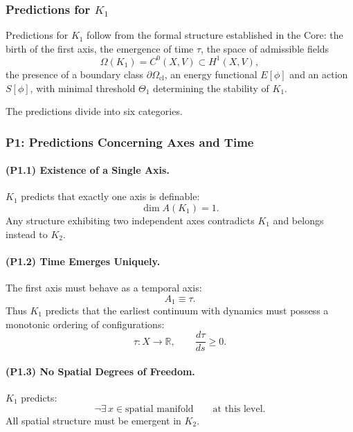 

\subsubsection{Predictions for \texorpdfstring{$K_1$}{K_1}}
\label{sec:predictions-k1}

Predictions for $K_1$ follow from the formal structure established in the
Core: the birth of the first axis, the emergence of time $\tau$, the space
of admissible fields
\[
\Omega(K_1) = C^0(X,V) \subset H^1(X,V),
\]
the presence of a boundary class $\partial\Omega_{\mathrm{cl}}$, an energy
functional $E[\phi]$ and an action $S[\phi]$, with minimal threshold
$\Theta_1$ determining the stability of $K_1$.

The predictions divide into six categories.

\subsubsection{P1: Predictions Concerning Axes and Time}

\paragraph{(P1.1) Existence of a Single Axis.}
$K_1$ predicts that exactly one axis is definable:
\[
\dim A(K_1) = 1.
\]
Any structure exhibiting two independent axes contradicts $K_1$ and belongs
instead to $K_2$.

\paragraph{(P1.2) Time Emerges Uniquely.}
The first axis must behave as a temporal axis:
\[
A_1 \equiv \tau.
\]
Thus $K_1$ predicts that the earliest continuum with dynamics must possess
a monotonic ordering of configurations:
\[
\tau: X \to \mathbb{R}, \qquad \frac{d\tau}{ds} \ge 0.
\]

\paragraph{(P1.3) No Spatial Degrees of Freedom.}
$K_1$ predicts:
\[
\neg \exists\, x \in \text{spatial manifold} \qquad\text{at this level}.
\]
All spatial structure must be emergent in $K_2$.

